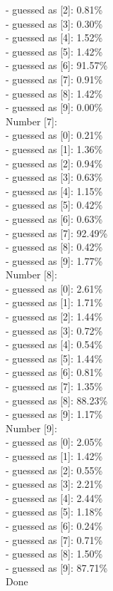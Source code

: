 {- guessed as [2]: 0.81\%\\
- guessed as [3]: 0.30\%\\
- guessed as [4]: 1.52\%\\
- guessed as [5]: 1.42\%\\
- guessed as [6]: 91.57\%\\
- guessed as [7]: 0.91\%\\
- guessed as [8]: 1.42\%\\
- guessed as [9]: 0.00\%\\
\newline
Number [7]:\\
- guessed as [0]: 0.21\%\\
- guessed as [1]: 1.36\%\\
- guessed as [2]: 0.94\%\\
- guessed as [3]: 0.63\%\\
- guessed as [4]: 1.15\%\\
- guessed as [5]: 0.42\%\\
- guessed as [6]: 0.63\%\\
- guessed as [7]: 92.49\%\\
- guessed as [8]: 0.42\%\\
- guessed as [9]: 1.77\%\\
\newline
Number [8]:\\
- guessed as [0]: 2.61\%\\
- guessed as [1]: 1.71\%\\
- guessed as [2]: 1.44\%\\
- guessed as [3]: 0.72\%\\
- guessed as [4]: 0.54\%\\
- guessed as [5]: 1.44\%\\
- guessed as [6]: 0.81\%\\
- guessed as [7]: 1.35\%\\
- guessed as [8]: 88.23\%\\
- guessed as [9]: 1.17\%\\
\newline
Number [9]:\\
- guessed as [0]: 2.05\%\\
- guessed as [1]: 1.42\%\\
- guessed as [2]: 0.55\%\\
- guessed as [3]: 2.21\%\\
- guessed as [4]: 2.44\%\\
- guessed as [5]: 1.18\%\\
- guessed as [6]: 0.24\%\\
- guessed as [7]: 0.71\%\\
- guessed as [8]: 1.50\%\\
- guessed as [9]: 87.71\%\\
\newline
Done\\
}

